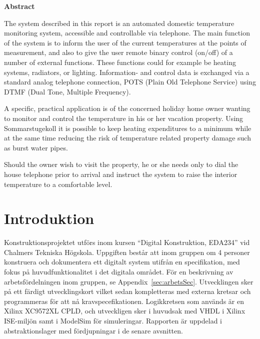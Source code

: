 \documentclass[a4paper,11pt]{article}
\begin{document}
\begin{center}
	{\noindent \bf Abstract}
\end{center}

	The system described in this report is an automated domestic temperature monitoring system, accessible and controllable via
	telephone. The main function of the system is to inform the user of the current temperatures
	at the points of measurement, and also to give the user remote binary control (on/off) of a number of external
	functions. These functions could for example be heating systems, radiators, or lighting. Information- and control data
	is exchanged via a standard analog telephone connection, POTS (Plain Old Telephone Service) using DTMF (Dual Tone, Multiple Frequency).

	A specific, practical application is of the concerned holiday home owner wanting to monitor and control the temperature 
	in his or her vacation property. Using Sommarstugekoll it is possible to keep heating expenditures to a minimum while at 
	the same time reducing the risk of temperature related property damage such as burst water pipes.

	Should the owner wish to visit the property, he or she needs only to dial the house telephone prior to arrival and instruct the system to raise
	the interior temperature to a comfortable level. 

\pagebreak

 \thispagestyle{empty}
	\tableofcontents
 \thispagestyle{empty}

\pagebreak

\setcounter{page}{1}
\section{Introduktion}

	Konstruktionsprojektet utförs inom kursen ``Digital Konstruktion, EDA234'' vid Chalmers Tekniska Högskola. Uppgiften består att inom gruppen om 4 personer konstruera och dokumentera
	ett digitalt system utifrån en specifikation, med fokus på huvudfunktionalitet i det digitala området. För en beskrivning av arbetsfördelningen inom gruppen, se Appendix~\ref{sec:arbetsSec}. Utvecklingen sker på ett färdigt utvecklingskort vilket sedan kompletteras med externa kretsar och programmeras för att nå kravspecefikationen. Logikkretsen som används är en Xilinx XC9572XL CPLD, och utveckligen sker i huvudsak med VHDL i Xilinx ISE-miljön samt i ModelSim för simuleringar. Rapporten är uppdelad i abstraktionslager med fördjupningar i de senare avsnitten. 
\end{document}
